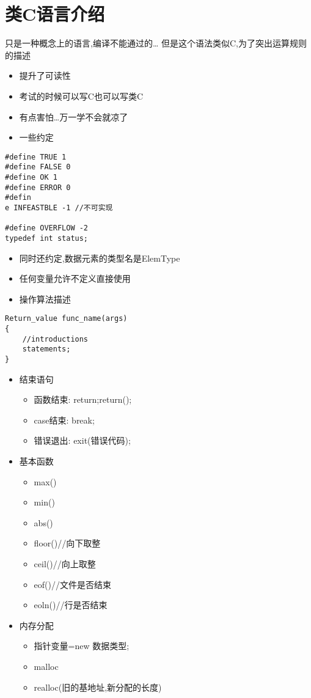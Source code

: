 \documentclass[11pt]{article}
\begin{document}
\section{类C语言介绍}
\label{sec:org8bfdefa}
只是一种概念上的语言,编译不能通过的\ldots{}
但是这个语法类似C,为了突出运算规则的描述
\begin{itemize}
\item 提升了可读性
\item 考试的时候可以写C也可以写类C
\item 有点害怕\ldots{}万一学不会就凉了
\item 一些约定
\end{itemize}
\begin{verbatim}
#define TRUE 1
#define FALSE 0
#define OK 1
#define ERROR 0
#defin
e INFEASTBLE -1 //不可实现

#define OVERFLOW -2
typedef int status;
\end{verbatim}
\begin{itemize}
\item 同时还约定,数据元素的类型名是ElemType
\item 任何变量允许不定义直接使用
\item 操作算法描述
\end{itemize}
\begin{verbatim}
Return_value func_name(args)
{
    //introductions
    statements;
}
\end{verbatim}
\begin{itemize}
\item 结束语句
\begin{itemize}
\item 函数结束:   return;return();
\item case结束:  break;
\item 错误退出:   exit(错误代码);
\end{itemize}
\item 基本函数
\begin{itemize}
\item max()
\item min()
\item abs()
\item floor()//向下取整
\item ceil()//向上取整
\item eof()//文件是否结束
\item eoln()//行是否结束
\end{itemize}
\item 内存分配
\begin{itemize}
\item 指针变量=new 数据类型;
\item malloc
\item realloc(旧的基地址,新分配的长度)
\end{itemize}
\end{itemize}
\end{document}
